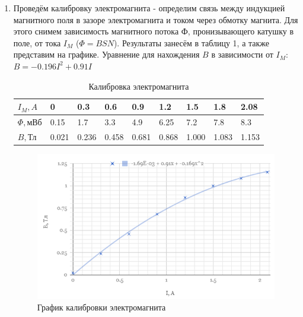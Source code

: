 \documentclass[a4paper]{article}
\begin{document}
\begin{enumerate}
    \item Проведём калибровку электромагнита - определим связь между индукцией магнитного поля в зазоре электромагнита и током через обмотку магнита. Для этого снимем зависимость магнитного потока Ф, пронизывающего катушку в поле, от тока $I_M$ ($\Phi = BSN$). Результаты занесём в таблицу 1, а также представим на графике. Уравнение для нахождения $B$ в зависимости от $I_M$: $B = -0.196I^2+0.91I$
    
    \begin{table}[h]
    \centering
    \begin{center}
    \caption{Калибровка электромагнита}
    \end{center}
    \vspace{0.1cm}
    \label{tab:my_label}
    \begin{tabular}{ |p{1.5cm}||p{0.7cm}|p{0.7cm}|p{0.7cm}|p{0.7cm}|p{0.7cm}|p{0.7cm}|p{0.7cm}|p{0.7cm}|  }
 \hline
$I_M, A$ & 0 & 0.3 & 0.6 & 0.9 & 1.2 & 1.5 & 1.8 & 2.08 \\
 \hline
 $\Phi, $мВб & 0.15 & 1.7 & 3.3 & 4.9 & 6.25 & 7.2 & 7.8 & 8.3\\
 \hline
 $B, $Тл & 0.021 & 0.236 & 0.458 & 0.681 & 0.868 & 1.000 & 1.083 & 1.153\\
 \hline
 
\end{tabular}
\end{table}
    
    \begin{figure}[h]
    \centering
    \includegraphics[width=15cm]{graph1.PNG}
    \caption{График калибровки электромагнита}
    \label{fig:vac}
\end{figure}
    

\end{enumerate}
\end{document}
